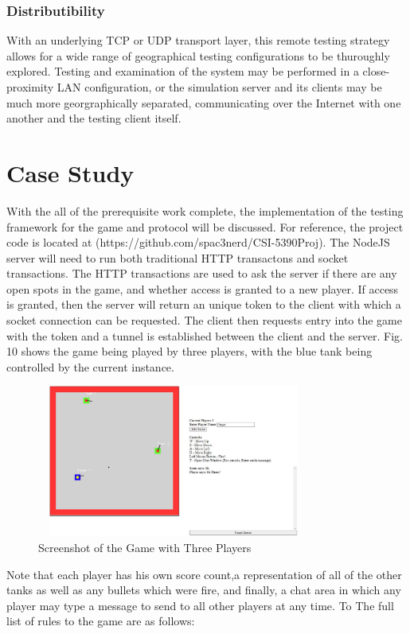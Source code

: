 \documentclass[conference]{IEEEtran}
\begin{document}
\subsubsection{Distributibility}With an underlying TCP or UDP transport layer, this remote testing strategy allows for a wide range of geographical testing configurations to be thuroughly explored. Testing and examination of the system may be performed in a close-proximity LAN configuration, or the simulation server and its clients may be much more georgraphically separated, communicating over the Internet with one another and the testing client itself.


\section{Case Study}

With the all of the prerequisite work complete, the implementation of the testing framework for the game and protocol will be discussed. For reference,
the project code is located at (https://github.com/spac3nerd/CSI-5390Proj). The NodeJS server 
will need to run both traditional HTTP transactons and socket transactions. The HTTP transactions are used to ask the server if 
there are any open spots in the game, and whether access is granted to a new player. If access is granted, then the server will return 
an unique token to the client with which a socket connection can be requested. The client then requests entry into the game 
with the token and a tunnel is established between the client and the server. Fig. 10 shows the game being played by three players, with
the blue tank being controlled by the current instance.  


\begin{figure}[htbp]
\centerline{\includegraphics [width = 9cm, height = 5cm] {GameScreenshot.jpg}}
\caption{Screenshot of the Game with Three Players}
\end{figure}

Note that each player has his own score count,a representation of all of the other tanks as well as any bullets which were fire, and finally, a chat area
in which any player may type a message to send to all other players at any time. To The full list of rules to the game are as follows:
\end{document}
